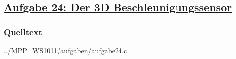 \subsection
{\href{http://cst.mi.fu-berlin.de/intern/19606-P-MPP/Aufgaben/040802.html}
{Aufgabe 24: Der 3D Beschleunigungssensor}}

\subsubsection*{Quelltext}


{../MPP_WS1011/aufgaben/aufgabe24.c}
